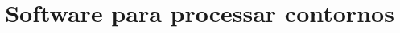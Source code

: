 \documentclass{article}
\title{Software para processar contornos}
\author{}
\begin{document}
\graphicspath{{figs/}{out/}{data/}{lily/}}

\maketitle




\end{document}
